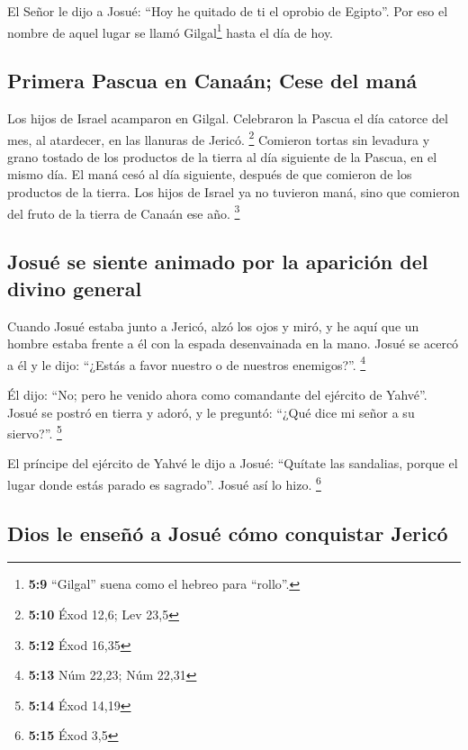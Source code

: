  El Señor le dijo a Josué: ``Hoy he quitado de ti el
oprobio de Egipto''. Por eso el nombre de aquel lugar se llamó
Gilgal\footnote{\textbf{5:9} ``Gilgal'' suena como el hebreo para
  ``rollo''.} hasta el día de hoy.

\hypertarget{primera-pascua-en-canauxe1n-cese-del-manuxe1}{%
\subsection{Primera Pascua en Canaán; Cese del
maná}\label{primera-pascua-en-canauxe1n-cese-del-manuxe1}}

 Los hijos de Israel acamparon en Gilgal. Celebraron la
Pascua el día catorce del mes, al atardecer, en las llanuras de Jericó.
\footnote{\textbf{5:10} Éxod 12,6; Lev 23,5}  Comieron
tortas sin levadura y grano tostado de los productos de la tierra al día
siguiente de la Pascua, en el mismo día.  El maná cesó al
día siguiente, después de que comieron de los productos de la tierra.
Los hijos de Israel ya no tuvieron maná, sino que comieron del fruto de
la tierra de Canaán ese año. \footnote{\textbf{5:12} Éxod 16,35}

\hypertarget{josuuxe9-se-siente-animado-por-la-apariciuxf3n-del-divino-general}{%
\subsection{Josué se siente animado por la aparición del divino
general}\label{josuuxe9-se-siente-animado-por-la-apariciuxf3n-del-divino-general}}

 Cuando Josué estaba junto a Jericó, alzó los ojos y
miró, y he aquí que un hombre estaba frente a él con la espada
desenvainada en la mano. Josué se acercó a él y le dijo: ``¿Estás a
favor nuestro o de nuestros enemigos?''. \footnote{\textbf{5:13} Núm
  22,23; Núm 22,31}

 Él dijo: ``No; pero he venido ahora como comandante del
ejército de Yahvé''. Josué se postró en tierra y adoró, y le preguntó:
``¿Qué dice mi señor a su siervo?''. \footnote{\textbf{5:14} Éxod 14,19}

 El príncipe del ejército de Yahvé le dijo a Josué:
``Quítate las sandalias, porque el lugar donde estás parado es
sagrado''. Josué así lo hizo. \footnote{\textbf{5:15} Éxod 3,5}

\hypertarget{dios-le-enseuxf1uxf3-a-josuuxe9-cuxf3mo-conquistar-jericuxf3}{%
\subsection{Dios le enseñó a Josué cómo conquistar
Jericó}\label{dios-le-enseuxf1uxf3-a-josuuxe9-cuxf3mo-conquistar-jericuxf3}}

